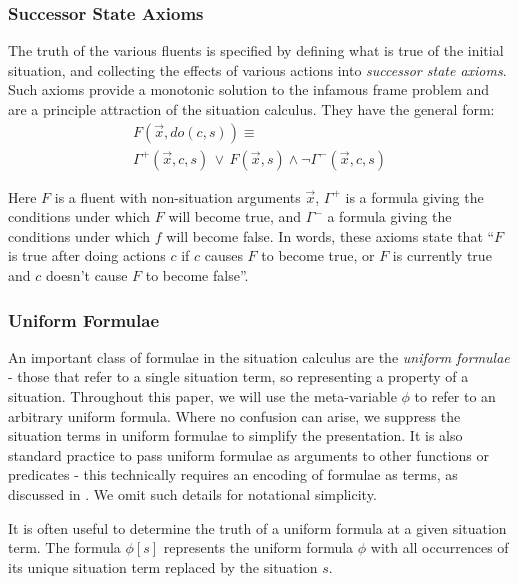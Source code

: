 \documentclass[letterpaper]{article}
\begin{document}
\subsubsection{Successor State Axioms}

The truth of the various fluents is specified by defining what is
true of the initial situation, and collecting the effects of various
actions into \emph{successor state axioms}. Such axioms provide a
monotonic solution to the infamous frame problem \cite{reiter91frameprob}
and are a principle attraction of the situation calculus. They have
the general form: \begin{multline*}
F(\overrightarrow{x},do(c,s))\equiv\\
\Gamma^{+}(\overrightarrow{x},c,s)\,\vee\, F(\overrightarrow{x},s)\wedge\neg\Gamma^{-}(\overrightarrow{x},c,s)\end{multline*}


Here $F$ is a fluent with non-situation arguments $\overrightarrow{x}$,
$\Gamma^{+}$ is a formula giving the conditions under which $F$
will become true, and $\Gamma^{-}$ a formula giving the conditions
under which $f$ will become false. In words, these axioms state that
{}``$F$ is true after doing actions $c$ if $c$ causes $F$ to
become true, or $F$ is currently true and $c$ doesn't cause $F$
to become false''.


\subsubsection{Uniform Formulae}

An important class of formulae in the situation calculus are the \emph{uniform
formulae} - those that refer to a single situation term, so representing
a property of a situation. Throughout this paper, we will use the
meta-variable $\phi$ to refer to an arbitrary uniform formula. Where
no confusion can arise, we suppress the situation terms in uniform
formulae to simplify the presentation. It is also standard practice
to pass uniform formulae as arguments to other functions or predicates
- this technically requires an encoding of formulae as terms, as discussed
in \cite{shapiro01casl_feat_inter}. We omit such details for notational
simplicity.

It is often useful to determine the truth of a uniform formula at
a given situation term. The formula $\phi[s]$ represents the uniform
formula $\phi$ with all occurrences of its unique situation term
replaced by the situation $s$.
\end{document}
